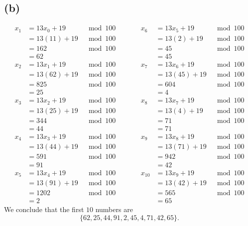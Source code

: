 \documentclass[12pt]{article}
\begin{document}
		\subsection*{(b)}
			\begin{align*}
				x_{1} &= 13x_{0} +19 &\mod 100 &\qquad & x_{6} &= 13 x_{5} + 19 &\mod 100 \\
				&= 13(11) + 19 &\mod 100 &\qquad & &= 13(2) + 19 &\mod 100 \\ 
				&= 162 &\mod 100 &\qquad & &= 45 &\mod 100 \\
				&= 62 & &\qquad & &= 45 & \\
				x_{2} &= 13x_{1} + 19 &\mod 100 &\qquad & x_{7} &= 13 x_{6} + 19 &\mod 100 \\
				&=13(62) + 19 &\mod 100 & \qquad & &= 13(45) + 19 &\mod 100 \\
				&= 825 &\mod 100 & \qquad & &= 604 &\mod 100 \\ 
				&=25 & &\qquad & &=4 & \\
				x_{3} &= 13x_{2} + 19 &\mod 100 & \qquad & x_{8} &= 13x_{7} +19 &\mod 100 \\
				&= 13(25) +19 &\mod 100 &\qquad & &=13(4) + 19 &\mod 100 \\
				&=344 &\mod 100 &\qquad & &= 71 &\mod 100 \\
				&= 44 & &\qquad & &= 71 & \\ 
				x_{4} &= 13x_{3} +19 &\mod 100 & \qquad & x_{9} &= 13x_{8} +19 &\mod 100 \\
				&= 13(44) +19 &\mod 100 &\qquad& &= 13(71) +19 &\mod 100 \\
				&= 591 &\mod 100 &\qquad & &= 942 &\mod 100 \\
				&= 91 & &\qquad & &=42 & \\
				x_{5} &= 13x_{4} +19 &\mod 100 &\qquad & x_{10} &= 13x_{9} +19 &\mod 100 \\
				&= 13(91) +19 &\mod 100 &\qquad & &=13(42) +19 &\mod 100 \\
				&= 1202 &\mod 100 & \qquad & &= 565 &\mod 100 \\
				&= 2 & &\qquad & &= 65 & 
			\end{align*}
			We conclude that the first $10$ numbers are 
			$$ \{62,25,44, 91, 2, 45, 4, 71,42, 65\}.$$
\end{document}
